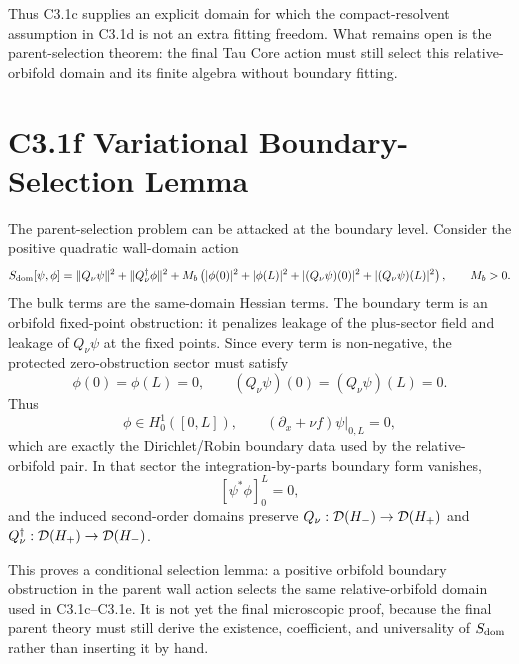 \documentclass[11pt]{article}
\begin{document}
Thus C3.1c supplies an explicit domain for which the compact-resolvent
assumption in C3.1d is not an extra fitting freedom.  What remains open is the
parent-selection theorem: the final Tau Core action must still select this
relative-orbifold domain and its finite algebra without boundary fitting.

\section{C3.1f Variational Boundary-Selection Lemma}
The parent-selection problem can be attacked at the boundary level.  Consider
the positive quadratic wall-domain action
\begin{equation}
S_{\rm dom}[\psi,\phi]
=
\|Q_\nu\psi\|^2+\|Q_\nu^\dagger\phi\|^2
+M_b\left(|\phi(0)|^2+|\phi(L)|^2
+|(Q_\nu\psi)(0)|^2+|(Q_\nu\psi)(L)|^2\right),
\qquad M_b>0 .
\end{equation}
The bulk terms are the same-domain Hessian terms.  The boundary term is an
orbifold fixed-point obstruction: it penalizes leakage of the plus-sector field
and leakage of $Q_\nu\psi$ at the fixed points.  Since every term is
non-negative, the protected zero-obstruction sector must satisfy
\begin{equation}
\phi(0)=\phi(L)=0,
\qquad
(Q_\nu\psi)(0)=(Q_\nu\psi)(L)=0 .
\end{equation}
Thus
\begin{equation}
\phi\in H^1_0([0,L]),
\qquad
(\partial_x+\nu f)\psi\big|_{0,L}=0 ,
\end{equation}
which are exactly the Dirichlet/Robin boundary data used by the
relative-orbifold pair.  In that sector the integration-by-parts boundary form
vanishes,
\begin{equation}
\left[\psi^*\phi\right]_0^L=0,
\end{equation}
and the induced second-order domains preserve
$Q_\nu:{\cal D}(H_-)\to{\cal D}(H_+)$ and
$Q_\nu^\dagger:{\cal D}(H_+)\to{\cal D}(H_-)$.

This proves a conditional selection lemma: a positive orbifold boundary
obstruction in the parent wall action selects the same relative-orbifold
domain used in C3.1c--C3.1e.  It is not yet the final microscopic proof,
because the final parent theory must still derive the existence, coefficient,
and universality of $S_{\rm dom}$ rather than inserting it by hand.
\end{document}

